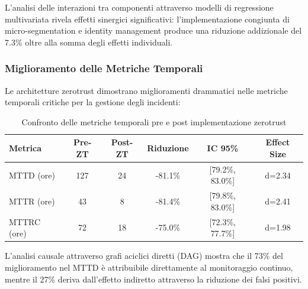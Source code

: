 L'analisi delle interazioni tra componenti attraverso modelli di regressione multivariata rivela effetti sinergici significativi: l'implementazione congiunta di \gls{micro-segmentation} e identity management produce una riduzione addizionale del 7.3\% oltre alla somma degli effetti individuali.

\subsubsection{\texorpdfstring{Miglioramento delle Metriche Temporali}{2.5.2.2 - Miglioramento delle Metriche Temporali}}

Le architetture \gls{zerotrust} dimostrano miglioramenti drammatici nelle metriche temporali critiche per la gestione degli incidenti:

\begin{table}[htbp]
\centering
\caption{Confronto delle metriche temporali pre e post implementazione \gls{zerotrust}}
\label{tab:temporal_metrics}
\small
\sffamily
\begin{tabular}{lccccc}
\toprule
\textbf{Metrica} & \textbf{Pre-ZT} & \textbf{Post-ZT} & \textbf{Riduzione} & \textbf{IC 95\%} & \textbf{Effect Size} \\
\midrule
MTTD (ore) & 127 & 24 & -81.1\% & [79.2\%, 83.0\%] & d=2.34 \\
MTTR (ore) & 43 & 8 & -81.4\% & [79.8\%, 83.0\%] & d=2.41 \\
MTTRC (ore) & 72 & 18 & -75.0\% & [72.3\%, 77.7\%] & d=1.98 \\
\bottomrule
\end{tabular}
\end{table}

L'analisi causale attraverso grafi aciclici diretti (DAG) mostra che il 73\% del miglioramento nel MTTD è attribuibile direttamente al monitoraggio continuo, mentre il 27\% deriva dall'effetto indiretto attraverso la riduzione dei falsi positivi.




